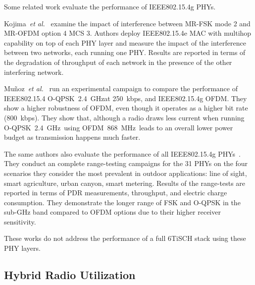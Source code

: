 \documentclass[sensors,article,submit,moreauthors,pdftex]{Definitions/mdpi}
\newcommand{\oqpsk}         {O-QPSK~2.4~GHz}
\newcommand{\ofdm}          {OFDM~868~MHz}
\newcommand{\etal}          {\textit{et al.}}
\begin{document}
Some related work evaluate the performance of IEEE802.15.4g PHYs.

Kojima~\etal~\cite{kojima15system} examine the impact of interference between MR-FSK mode 2 and MR-OFDM option 4 MCS 3. 
Authors deploy IEEE802.15.4e MAC with multihop capability on top of each PHY layer and measure the impact of the interference between two networks, each running one PHY.
Results are reported in terms of the degradation of throughput of each network in the presence of the other interfering network.

Mu\~noz~\etal~\cite{munoz18overview} run an experimental campaign to compare the performance of
    IEEE802.15.4 \oqpsk at 250~kbps, and
    IEEE802.15.4g OFDM.
They show a higher robustness of OFDM, even though it operates as a higher bit rate (800~kbps).
They show that, although a radio draws less current when running \oqpsk\, using \ofdm\ leads to an overall lower power budget as transmission happens much faster.

The same authors also evaluate the performance of all IEEE802.15.4g PHYs~\cite{munoz18evaluation}.
They conduct an complete range-testing campaigns for the 31 PHYs on the four scenarios they consider the most prevalent in outdoor applications:
    line of sight,
    smart agriculture,
    urban canyon,
    smart metering. 
Results of the range-tests are reported in terms of PDR measurements, throughput, and electric charge consumption.
They demonstrate the longer range of FSK and O-QPSK in the sub-GHz band compared to OFDM options due to their higher receiver sensitivity.  


These works do not address the performance of a full 6TiSCH stack using these PHY layers.  

\subsection{Hybrid Radio Utilization}
\label{sec:related_hybrid}
\end{document}
